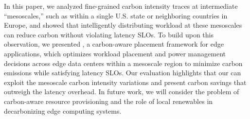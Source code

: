 In this paper, we analyzed fine-grained carbon intensity traces at intermediate ``mesoscales,'' such as within a single U.S. state or neighboring countries in Europe, and showed that intelligently distributing workload at these mesoscales can reduce carbon without violating latency SLOs.
To build upon this observation, we presented \proposedsystem, a carbon-aware placement framework for edge applications, which optimizes workload placement and power management decisions across edge data centers within a mesoscale region to minimize carbon emissions while satisfying latency SLOs. 
Our evaluation highlights that our \proposedsystem can exploit the mesoscale carbon intensity variations and present carbon savings that outweigh the latency overhead. 
In future work, we will consider the problem of carbon-aware resource provisioning and the role of local renewables in decarbonizing edge computing systems.


